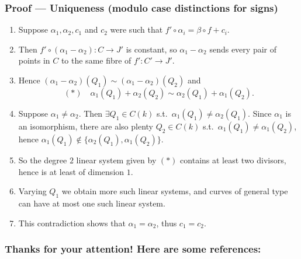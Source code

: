 \documentclass[notheorems, hyperref]{beamer}
\theoremstyle{darkgreentheorem}
\theoremstyle{darkbluedefinition}
\theoremstyle{darkredexample}
\theoremstyle{remark}
\begin{document}
\begin{frame}
    \frametitle{Proof --- Uniqueness (modulo case distinctions for signs)}
    \begin{enumerate}[label=\textbullet]
	\item Suppose $\alpha_{1},\alpha_{2},c_{1}$ and $c_{2}$ were such that $f'\circ\alpha_{i}=\beta\circ f+c_{i}$.
	\item Then $f'\circ (\alpha_{1}-\alpha_{2})\colon C\to J'$ is constant, so $\alpha_{1}-\alpha_{2}$ sends every pair of points in $C$ to the same fibre of $f'\colon C'\to J'$.
	\item Hence $(\alpha_{1}-\alpha_{2})(Q_{1})\sim (\alpha_{1}-\alpha_{2})(Q_{2})$ and
	    \[ (*) \quad \alpha_{1}(Q_{1})+\alpha_{2}(Q_{2})\sim \alpha_{2}(Q_{1})+\alpha_{1}(Q_{2}). \]
	\item Suppose $\alpha_{1}\neq \alpha_{2}$.
	    Then $\exists Q_{1}\in C(k)$ s.t.~$\alpha_{1}(Q_{1})\neq \alpha_{2}(Q_{1})$.
	    Since $\alpha_{1}$ is an isomorphism, there are also plenty $Q_{2}\in C(k)$ s.t.~$\alpha_{1}(Q_{1})\neq \alpha_{1}(Q_{2})$, hence $\alpha_{1}(Q_{1})\not\in \{\alpha_{2}(Q_{1}),\alpha_{1}(Q_{2})\}$.
	\item So the degree $2$ linear system given by $(*)$ contains at least two divisors, hence is at least of dimension $1$.
	\item Varying $Q_{1}$ we obtain more such linear systems, and curves of general type can have at most one such linear system.
	\item This contradiction shows that $\alpha_{1}=\alpha_{2}$, thus $c_{1}=c_{2}$.
    \end{enumerate}
\end{frame}

\begin{frame}
    \frametitle{Thanks for your attention! Here are some references:}
    
    
\end{frame}
\end{document}
